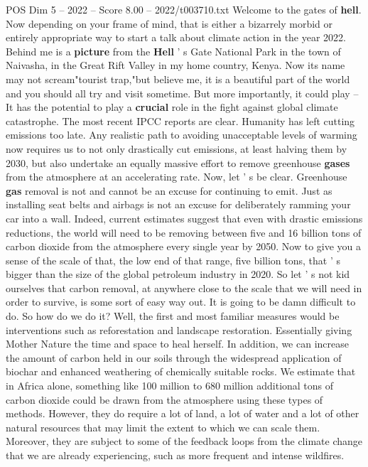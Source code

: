 \begin{textsample}{POS Dim 5 – 2022 – Score 8.00 – 2022/t003710.txt}  \label{ex:f5_pos_046}
Welcome to the gates of \textbf{hell}.
Now depending on your frame of mind, that is either a bizarrely morbid or entirely appropriate way to start a talk about climate action in the year 2022.
Behind me is a \textbf{picture} from the \textbf{Hell} ' s Gate National Park in the town of Naivasha, in the Great Rift Valley in my home country, Kenya.
Now its name may not scream"tourist trap,"but believe me, it is a beautiful part of the world and you should all try and visit sometime.
But more importantly, it could play -- It has the potential to play a \textbf{crucial} role in the fight against global climate catastrophe.
The most recent IPCC reports are clear.
Humanity has left cutting emissions too late.
Any realistic path to avoiding unacceptable levels of warming now requires us to not only drastically cut emissions, at least halving them by 2030, but also undertake an equally massive effort to remove greenhouse \textbf{gases} from the atmosphere at an accelerating rate.
Now, let ' s be clear.
Greenhouse \textbf{gas} removal is not and cannot be an excuse for continuing to emit.
Just as installing seat belts and airbags is not an excuse for deliberately ramming your car into a wall.
Indeed, current estimates suggest that even with drastic emissions reductions, the world will need to be removing between five and 16 billion tons of carbon dioxide from the atmosphere every single year by 2050.
Now to give you a sense of the scale of that, the low end of that range, five billion tons, that ' s bigger than the size of the global petroleum industry in 2020.
So let ' s not kid ourselves that carbon removal, at anywhere close to the scale that we will need in order to survive, is some sort of easy way out.
It is going to be damn difficult to do.
So how do we do it?
Well, the first and most familiar measures would be interventions such as reforestation and landscape restoration.
Essentially giving Mother Nature the time and space to heal herself.
In addition, we can increase the amount of carbon held in our soils through the widespread application of biochar and enhanced weathering of chemically suitable rocks.
We estimate that in Africa alone, something like 100 million to 680 million additional tons of carbon dioxide could be drawn from the atmosphere using these types of methods.
However, they do require a lot of land, a lot of water and a lot of other natural resources that may limit the extent to which we can scale them.
Moreover, they are subject to some of the feedback loops from the climate change that we are already experiencing, such as more frequent and intense wildfires.

\end{textsample}
